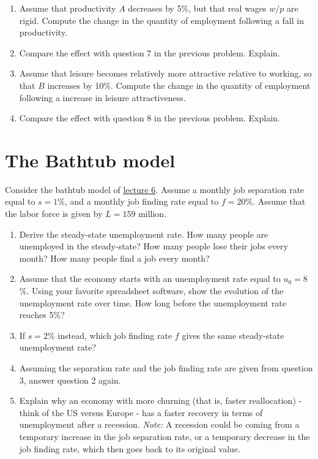 \documentclass[]{book}
\begin{document}
\begin{enumerate}
\def\labelenumi{\arabic{enumi}.}
\item
  Assume that productivity \(A\) decreases by 5\%, but that real wages
  \(w/p\) are rigid. Compute the change in the quantity of employment
  following a fall in productivity.
\item
  Compare the effect with question 7 in the previous problem. Explain.
\item
  Assume that leisure becomes relatively more attractive relative to
  working, so that \(B\) increases by 10\%. Compute the change in the
  quantity of employment following a increase in leisure attractiveness.
\item
  Compare the effect with question 8 in the previous problem. Explain.
\end{enumerate}

\section{The Bathtub model}\label{the-bathtub-model}

Consider the bathtub model of \protect\hyperlink{labor-market}{lecture
6}. Assume a monthly job separation rate equal to \(s=1\)\%, and a
monthly job finding rate equal to \(f=20\)\%. Assume that the labor
force is given by \(L=159\) million.

\begin{enumerate}
\def\labelenumi{\arabic{enumi}.}
\item
  Derive the steady-state unemployment rate. How many people are
  unemployed in the steady-state? How many people lose their jobs every
  month? How many people find a job every month?
\item
  Assume that the economy starts with an unemployment rate equal to
  \(u_0=8\)\%. Using your favorite spreadsheet software, show the
  evolution of the unemployment rate over time. How long before the
  unemployment rate reaches 5\%?
\item
  If \(s=2\)\% instead, which job finding rate \(f\) gives the same
  steady-state unemployment rate?
\item
  Assuming the separation rate and the job finding rate are given from
  question 3, answer question 2 again.
\item
  Explain why an economy with more churning (that is, faster
  reallocation) - think of the US versus Europe - has a faster recovery
  in terms of unemployment after a recession. \emph{Note:} A recession
  could be coming from a temporary increase in the job separation rate,
  or a temporary decrease in the job finding rate, which then goes back
  to its original value.
\end{enumerate}
\end{document}
